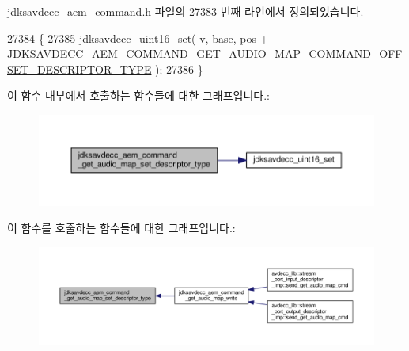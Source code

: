 jdksavdecc\+\_\+aem\+\_\+command.\+h 파일의 27383 번째 라인에서 정의되었습니다.


\begin{DoxyCode}
27384 \{
27385     \hyperlink{group__endian_ga14b9eeadc05f94334096c127c955a60b}{jdksavdecc\_uint16\_set}( v, base, pos + 
      \hyperlink{group__command__get__audio__map_ga1fc1effdd030f99bd3f435ce86d5e86c}{JDKSAVDECC\_AEM\_COMMAND\_GET\_AUDIO\_MAP\_COMMAND\_OFFSET\_DESCRIPTOR\_TYPE}
       );
27386 \}
\end{DoxyCode}


이 함수 내부에서 호출하는 함수들에 대한 그래프입니다.\+:
\nopagebreak
\begin{figure}[H]
\begin{center}
\leavevmode
\includegraphics[width=350pt]{group__command__get__audio__map_ga8ab8884a6cc2320d43da05a5c24c8bb4_cgraph}
\end{center}
\end{figure}




이 함수를 호출하는 함수들에 대한 그래프입니다.\+:
\nopagebreak
\begin{figure}[H]
\begin{center}
\leavevmode
\includegraphics[width=350pt]{group__command__get__audio__map_ga8ab8884a6cc2320d43da05a5c24c8bb4_icgraph}
\end{center}
\end{figure}


